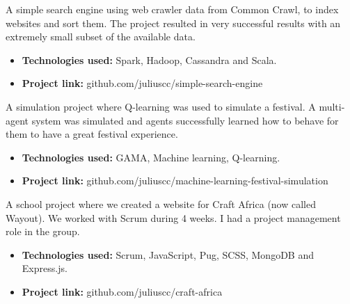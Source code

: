 
\divider

A simple search engine using web crawler data from Common Crawl, to index websites and sort them. The project resulted in very successful results with an extremely small subset of the available data.

\vspace{4pt}

\begin{itemize}
    \item \textbf{Technologies used:} Spark, Hadoop, Cassandra and Scala.
    \item \textbf{Project link:} github.com/juliuscc/simple-search-engine
\end{itemize}

\divider


A simulation project where Q-learning was used to simulate a festival. A multi-agent system was simulated and agents successfully learned how to behave for them to have a great festival experience.

\vspace{4pt}

\begin{itemize}
    \item \textbf{Technologies used:} GAMA, Machine learning, Q-learning.
    \item \textbf{Project link:} github.com/juliuscc/machine-learning-festival-simulation
\end{itemize}


\divider


A school project where we created a website for Craft Africa (now called Wayout). We worked with Scrum during 4 weeks. I had a project management role in the group.

\vspace{4pt}

\begin{itemize}
    \item \textbf{Technologies used:} Scrum, JavaScript, Pug, SCSS, MongoDB and Express.js.
    \item \textbf{Project link:} github.com/juliuscc/craft-africa
\end{itemize}
